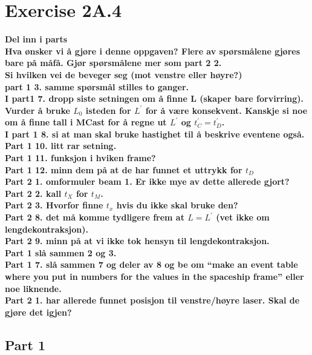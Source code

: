 \documentclass[a4paper,10pt,english]{article}
\begin{document}
\section*{Exercise 2A.4}
\textbf{Del inn i parts\\Hva ønsker vi å gjøre i denne oppgaven? Flere av spørsmålene gjøres bare på måfå. Gjør spørsmålene mer som part 2 2.\\Si hvilken vei de beveger seg (mot venstre eller høyre?)\\part 1 3. samme spørsmål stilles to ganger.\\I part1 7. dropp siste setningen om å finne L (skaper bare forvirring). Vurder å bruke $L_{0}$ isteden for $L^{\prime}$ for å være konsekvent. Kanskje si noe om å finne tall i MCast for å regne ut $L^{\prime}$ og $t_{C}^{\prime}=t_{D}^{\prime}$.\\ I part 1 8. si at man skal bruke hastighet til å beskrive eventene også.\\ Part 1 10. litt rar setning.\\Part 1 11. funksjon i hviken frame?\\Part 1 12. minn dem på at de har funnet et uttrykk for $t_{D}$\\Part 2 1. omformuler beam 1. Er ikke mye av dette allerede gjort?\\Part 2 2. kall $t_{X}$ for $t_{M}$.\\Part 2 3. Hvorfor finne $t_{x}$ hvis du ikke skal bruke den?\\Part 2 8. det må komme tydligere frem at $L=L^{\prime}$ (vet ikke om lengdekontraksjon).\\Part 2 9. minn på at vi ikke tok hensyn til lengdekontraksjon.\\Part 1 slå sammen 2 og 3.\\Part 1 7. slå sammen 7 og deler av 8 og be om ``make an event table where you put in numbers for the values in the spaceship frame'' eller noe liknende.\\Part 2 1. har allerede funnet posisjon til venstre/høyre laser. Skal de gjøre det igjen?}
\subsection*{Part 1}
\end{document}
